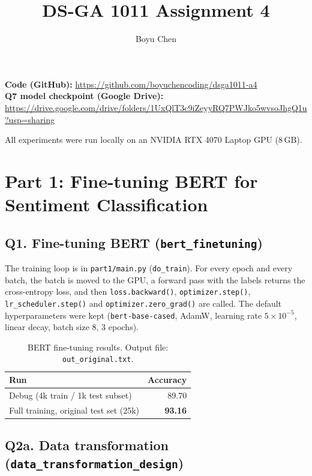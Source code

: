 \documentclass[11pt]{article}
\title{DS-GA 1011 Assignment 4}
\author{Boyu Chen}
\date{}
\begin{document}
\sloppy
\maketitle

\textbf{Code (GitHub):} \url{https://github.com/boyuchencoding/dsga1011-a4}\\
\textbf{Q7 model checkpoint (Google Drive):} \url{https://drive.google.com/drive/folders/1UxQlT3c9iZeyyRQ7PWJko5wvsoJhgQ1u?usp=sharing}

All experiments were run locally on an NVIDIA RTX 4070 Laptop GPU (8\,GB).

\section{Part 1: Fine-tuning BERT for Sentiment Classification}

\subsection{Q1. Fine-tuning BERT (\texttt{bert\_finetuning})}

The training loop is in \texttt{part1/main.py} (\texttt{do\_train}). For every epoch and every batch, the
batch is moved to the GPU, a forward pass with the labels returns the cross-entropy loss, and then
\texttt{loss.backward()}, \texttt{optimizer.step()}, \texttt{lr\_scheduler.step()} and
\texttt{optimizer.zero\_grad()} are called. The default hyperparameters were kept
(\texttt{bert-base-cased}, AdamW, learning rate $5\times10^{-5}$, linear decay, batch size 8, 3 epochs).

\begin{table}[H]
\centering
\begin{tabular}{lr}
\toprule
Run & Accuracy \\
\midrule
Debug (4k train / 1k test subset) & 89.70 \\
Full training, original test set (25k) & \textbf{93.16} \\
\bottomrule
\end{tabular}
\caption{BERT fine-tuning results. Output file: \texttt{out\_original.txt}.}
\end{table}

\subsection{Q2a. Data transformation (\texttt{data\_transformation\_design})}
\end{document}
